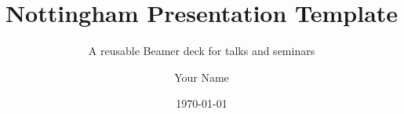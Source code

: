 \title{Nottingham Presentation Template}
\subtitle{A reusable Beamer deck for talks and seminars}
\author{Your Name}
\date{\today}



\maketitle
